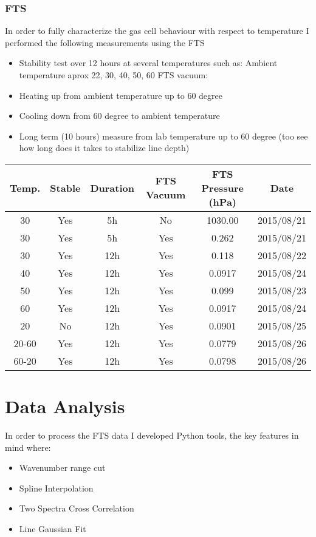 \documentclass[master,       %
               twoside,        %
               BCOR10mm,       %
               ngerman,english  %
               ]{GAUBM_astro}
\begin{document}
\subsubsection{FTS}
In order to fully characterize the gas cell behaviour with respect to temperature I performed the following 
measurements using the FTS
\begin{itemize}
 \item Stability test over 12 hours at several temperatures such as: Ambient temperature aprox 22, 30, 
40, 50, 60 FTS vacuum:
 \item Heating up from ambient temperature up to 60 degree
 \item Cooling down from 60 degree to ambient temperature
 \item Long term (10 hours) measure from lab temperature up to 60 degree (too see how long does it takes to stabilize 
line depth)
\end{itemize}
\begin{center}
\begin{tabular}{|c|c|c|c|c|c|}
\hline
Temp. & Stable & Duration & FTS Vacuum & FTS Pressure (hPa) & Date\\
\hline
30 & Yes & 5h & No & 1030.00 & 2015/08/21\\
\hline
30 & Yes & 5h & Yes & 0.262 & 2015/08/21\\
\hline
30 & Yes & 12h & Yes & 0.118 & 2015/08/22\\
\hline
40 & Yes & 12h & Yes & 0.0917 & 2015/08/24\\
\hline           
50 & Yes & 12h & Yes & 0.099 &2015/08/23 \\
\hline          
60 & Yes & 12h & Yes & 0.0917 & 2015/08/24\\
\hline
20 & No & 12h & Yes& 0.0901 &2015/08/25 \\
\hline
20-60 & Yes & 12h & Yes & 0.0779 & 2015/08/26\\
\hline              
60-20 & Yes & 12h & Yes & 0.0798 &2015/08/26 \\
\hline
\end{tabular}
\end{center}


\section{Data Analysis}
In order to process the FTS data I developed Python tools, the key features in mind where:
\begin{itemize}
 \item Wavenumber range cut
 \item Spline Interpolation
 \item Two Spectra Cross Correlation
 \item Line Gaussian Fit
\end{itemize}
\end{document}
